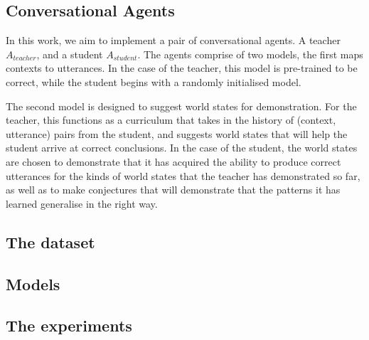 \subsection{Conversational Agents}

In this work, we aim to implement a pair of conversational agents. A teacher $A_{teacher}$, and a student $A_{student}$. The agents comprise of two models, the first maps contexts to utterances. In the case of the teacher, this model is pre-trained to be correct, while the student begins with a randomly initialised model.

The second model is designed to suggest world states for demonstration. For the teacher, this functions as a curriculum that takes in the history of (context, utterance) pairs from the student, and suggests world states that will help the student arrive at correct conclusions. In the case of the student, the world states are chosen to demonstrate that it has acquired the ability to produce correct utterances for the kinds of world states that the teacher has demonstrated so far, as well as to make conjectures that will demonstrate that the patterns it has learned generalise in the right way.

\subsection{The dataset}



\subsection{Models}

\subsection{The experiments}
